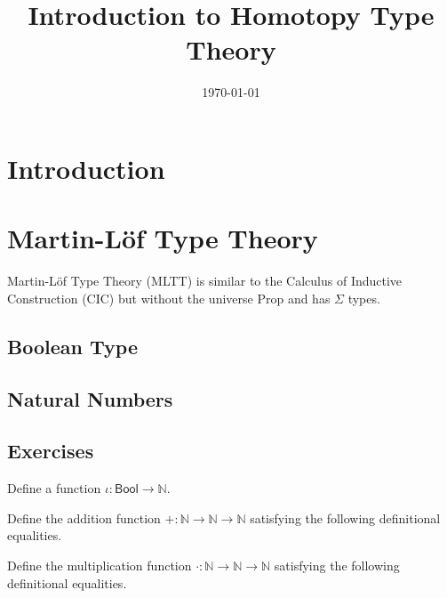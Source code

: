\documentclass{amsart}
\title{Introduction to Homotopy Type Theory}
\author{}
\date{\today}
\begin{document}
\maketitle
\tableofcontents

\newcommand{\Bool}[0]{\ensuremath{\mathsf{Bool}}}
\newcommand{\Nat}[0]{\ensuremath{\mathbb{N}}}

\section{Introduction}
\label{sec:introduction}

\section{Martin-L\"{o}f Type Theory}
\label{sec:martin-lof-type-theory}
Martin-L\"{o}f Type Theory (MLTT) is similar to the Calculus of Inductive Construction (CIC) but without the universe Prop and has $\Sigma$ types.

\subsection{Boolean Type}
\label{sec:boolean-type}

\subsection{Natural Numbers}
\label{sec:natural-numbers}


\subsection{Exercises}
\label{sec:exercises}

\begin{ex}
  Define a function $\iota : \Bool \to \Nat$.
\end{ex}

\begin{ex}
  Define the addition function $+ : \Nat \to \Nat \to \Nat$ satisfying the following definitional equalities.
\end{ex}

\begin{ex}
  Define the multiplication function $\cdot : \Nat \to \Nat \to \Nat$ satisfying the following definitional equalities.
\end{ex}



\end{document}
